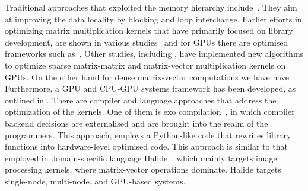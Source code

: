 Traditional approaches that exploited the memory hierarchy include~\cite{van1997summa,low2004api}. They aim at improving the data locality by blocking and loop interchange.
Earlier efforts in optimizing matrix multiplication kernels that have primarily focused on library development, are shown in various studies~\cite{anderson1999lapack, goto2008high, low2004api, choi1992scalapack,MKL} and for GPUs there are optimised frameworks such as~\cite{abdelfattah2016kblas}. 
Other studies, including \cite{fatahalian2004understanding, dorrance2014scalable, dalton2015optimizing, nagasaka2017high}, have implemented new algorithms to optimize sparse matrix-matrix and matrix-vector multiplication kernels on GPUs. On the other hand for dense matrix-vector computations we have have~\cite{fujimoto2008dense,nath2011optimizing}  Furthermore,  a GPU and CPU-GPU systems framework has been developed, as outlined in \cite{liu2015framework}. 
There are compiler and language approaches that address the optimization of the kernels. One of them is exo compilation~\cite{ikarashi2022exocompilation}, in which compiler backend decisions are externalised and are brought into the realm of the programmers. This approach, employs a  Python-like code that rewrites library functions into hardware-level optimised code. This approach is similar to that employed in domain-specific language Halide~\cite{ragan2013halide}, which mainly targets image processing kernels, where matrix-vector operations dominate. Halide targets single-node, multi-node, and GPU-based systems. 
